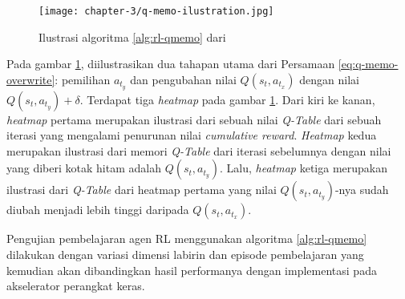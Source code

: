\begin{figure}[H]
	\centering
	\texttt{[image: chapter-3/q-memo-ilustration.jpg]}
	\caption{Ilustrasi algoritma \ref{alg:rl-qmemo} dari \parencite{mazaya2024reinforcement}}
	\label{fig:q-memo-ilustration}
\end{figure}

Pada gambar \ref{fig:q-memo-ilustration}, diilustrasikan dua tahapan utama dari Persamaan \ref{eq:q-memo-overwrite}: pemilihan $a_{t_y}$ dan pengubahan nilai  $Q(s_{t},a_{t_x})$ dengan nilai $Q(s_{t},a_{t_y}) + \delta$. Terdapat tiga \textit{heatmap} pada gambar \ref{fig:q-memo-ilustration}. Dari kiri ke kanan, \textit{heatmap} pertama merupakan ilustrasi dari sebuah nilai \textit{Q-Table} dari sebuah iterasi yang mengalami penurunan nilai \textit{cumulative reward}. \textit{Heatmap} kedua merupakan ilustrasi dari memori \textit{Q-Table} dari iterasi sebelumnya dengan nilai yang diberi kotak hitam adalah $Q(s_{t},a_{t_y})$. Lalu, \textit{heatmap} ketiga merupakan ilustrasi dari \textit{Q-Table} dari heatmap pertama yang nilai $Q(s_{t},a_{t_y})$-nya sudah diubah menjadi lebih tinggi daripada $Q(s_{t},a_{t_x})$.

Pengujian pembelajaran agen \ac{RL} menggunakan algoritma \ref{alg:rl-qmemo} dilakukan dengan variasi dimensi labirin dan episode pembelajaran yang kemudian akan dibandingkan hasil performanya dengan implementasi pada akselerator perangkat keras.
